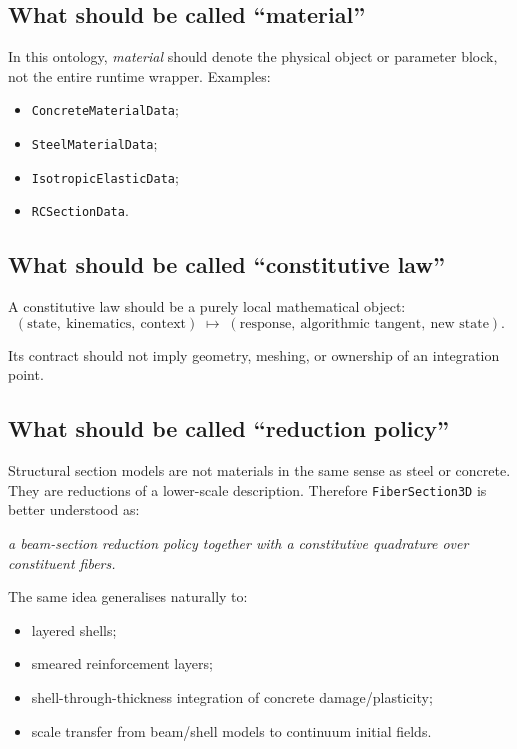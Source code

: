 \subsection{What should be called ``material''}

In this ontology, \emph{material} should denote the physical object or
parameter block, not the entire runtime wrapper.  Examples:
\begin{itemize}
  \item \texttt{ConcreteMaterialData};
  \item \texttt{SteelMaterialData};
  \item \texttt{IsotropicElasticData};
  \item \texttt{RCSectionData}.
\end{itemize}

\subsection{What should be called ``constitutive law''}

A constitutive law should be a purely local mathematical object:
\[
(\text{state},\ \text{kinematics},\ \text{context})
\;\mapsto\;
(\text{response},\ \text{algorithmic tangent},\ \text{new state}).
\]

Its contract should not imply geometry, meshing, or ownership of an
integration point.

\subsection{What should be called ``reduction policy''}

Structural section models are not materials in the same sense as steel or
concrete.  They are reductions of a lower-scale description.  Therefore
\texttt{FiberSection3D} is better understood as:
\begin{center}
\emph{a beam-section reduction policy together with a constitutive quadrature
over constituent fibers.}
\end{center}

The same idea generalises naturally to:
\begin{itemize}
  \item layered shells;
  \item smeared reinforcement layers;
  \item shell-through-thickness integration of concrete damage/plasticity;
  \item scale transfer from beam/shell models to continuum initial fields.
\end{itemize}

